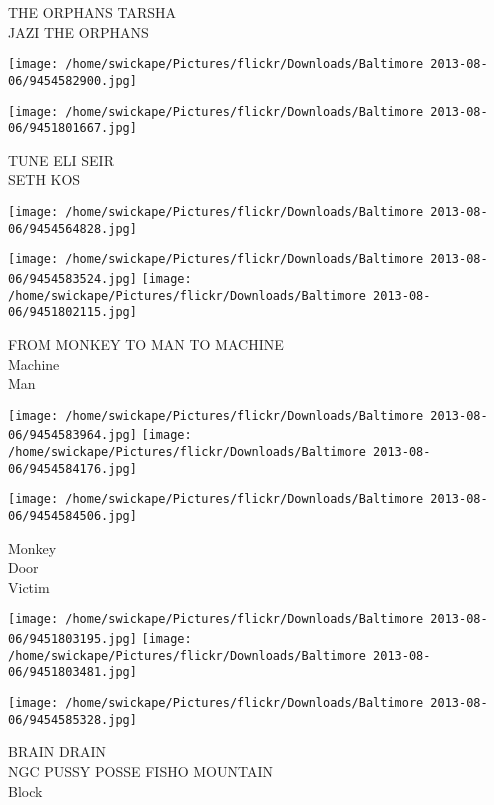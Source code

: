\documentclass[10pt,letterpaper]{article}
\begin{document}
THE ORPHANS TARSHA\\
JAZI THE ORPHANS\\
\pagebreak

\texttt{[image: /home/swickape/Pictures/flickr/Downloads/Baltimore 2013-08-06/9454582900.jpg]}

\vspace{0.25in}
\texttt{[image: /home/swickape/Pictures/flickr/Downloads/Baltimore 2013-08-06/9451801667.jpg]}

TUNE ELI SEIR\\
SETH KOS\\
\pagebreak

\texttt{[image: /home/swickape/Pictures/flickr/Downloads/Baltimore 2013-08-06/9454564828.jpg]}

\vspace{0.25in}
\texttt{[image: /home/swickape/Pictures/flickr/Downloads/Baltimore 2013-08-06/9454583524.jpg]}
\texttt{[image: /home/swickape/Pictures/flickr/Downloads/Baltimore 2013-08-06/9451802115.jpg]}

FROM MONKEY TO MAN TO MACHINE\\
Machine\\
Man\\
\pagebreak

\texttt{[image: /home/swickape/Pictures/flickr/Downloads/Baltimore 2013-08-06/9454583964.jpg]}
\texttt{[image: /home/swickape/Pictures/flickr/Downloads/Baltimore 2013-08-06/9454584176.jpg]}

\vspace{0.25in}
\texttt{[image: /home/swickape/Pictures/flickr/Downloads/Baltimore 2013-08-06/9454584506.jpg]}

Monkey\\
Door\\
Victim\\
\pagebreak

\texttt{[image: /home/swickape/Pictures/flickr/Downloads/Baltimore 2013-08-06/9451803195.jpg]}
\texttt{[image: /home/swickape/Pictures/flickr/Downloads/Baltimore 2013-08-06/9451803481.jpg]}

\vspace{0.25in}
\texttt{[image: /home/swickape/Pictures/flickr/Downloads/Baltimore 2013-08-06/9454585328.jpg]}

BRAIN DRAIN\\
NGC PUSSY POSSE FISHO MOUNTAIN\\
Block\\
\pagebreak
\end{document}
